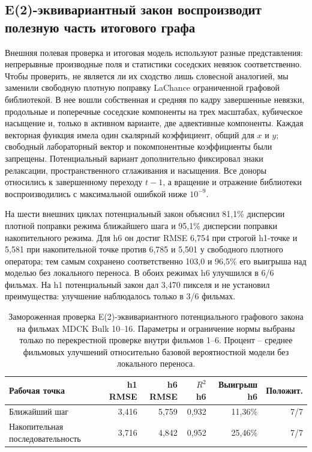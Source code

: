 \documentclass[11pt,a4paper]{article}
\begin{document}
\subsection{E(2)-эквивариантный закон воспроизводит полезную часть итогового графа}
Внешняя полевая проверка и итоговая модель используют разные представления: непрерывные производные поля и статистики соседских невязок соответственно. Чтобы проверить, не является ли их сходство лишь словесной аналогией, мы заменили свободную плотную поправку LaChance ограниченной графовой библиотекой. В нее вошли собственная и средняя по кадру завершенные невязки, продольные и поперечные соседские компоненты на трех масштабах, кубическое насыщение и, только в активном варианте, две адвективные компоненты. Каждая векторная функция имела один скалярный коэффициент, общий для $x$ и $y$; свободный лабораторный вектор и покомпонентные коэффициенты были запрещены. Потенциальный вариант дополнительно фиксировал знаки релаксации, пространственного сглаживания и насыщения. Все доноры относились к завершенному переходу $t-1$, а вращение и отражение библиотеки воспроизводились с максимальной ошибкой ниже $10^{-9}$.

На шести внешних циклах потенциальный закон объяснил 81,1\% дисперсии плотной поправки режима ближайшего шага и 95,1\% дисперсии поправки накопительного режима. Для h6 он достиг RMSE 6,754 при строгой h1-точке и 5,581 при накопительной точке против 6,785 и 5,501 у свободного плотного оператора; тем самым сохранено соответственно 103,0 и 96,5\% его выигрыша над моделью без локального переноса. В обоих режимах h6 улучшился в 6/6 фильмах. На h1 потенциальный закон дал 3,470 пикселя и не установил преимущества: улучшение наблюдалось только в 3/6 фильмах.

\begin{table}[H]
\centering
\caption{Замороженная проверка E(2)-эквивариантного потенциального графового закона на фильмах MDCK Bulk 10--16. Параметры и ограничение нормы выбраны только по перекрестной проверке внутри фильмов 1--6. Процент -- среднее фильмовых улучшений относительно базовой вероятностной модели без локального переноса.}
\label{tab:equivariant_bridge}
\small
\setlength{\tabcolsep}{4.5pt}
\begin{tabularx}{\textwidth}{@{}Y r r r r r@{}}
\toprule
Рабочая точка & h1 RMSE & h6 RMSE & $R^2$ h6 & Выигрыш h6 & Положит. \\
\midrule
Ближайший шаг & 3{,}416 & 5{,}759 & 0{,}932 & 11{,}36\% & 7/7 \\
Накопительная последовательность & 3{,}716 & 4{,}842 & 0{,}952 & 25{,}46\% & 7/7 \\
\bottomrule
\end{tabularx}
\end{table}
\end{document}
